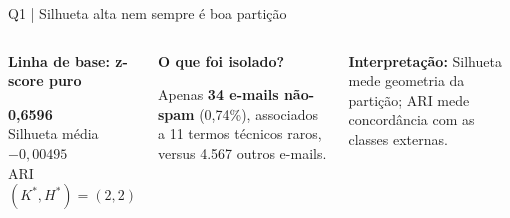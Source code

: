 \documentclass[aspectratio=169,11pt]{beamer}
\begin{document}
\begin{frame}[t]{Q1 | Silhueta alta nem sempre é boa partição}

\begin{columns}[T,onlytextwidth]
\begin{simplebox}\centering
\small \textbf{Linha de base: z-score puro}\par\vspace{2mm}
{\fontsize{23}{24}\selectfont\bfseries\color{laranja}0,6596}\\\scriptsize Silhueta média\\[2mm]
{\fontsize{23}{24}\selectfont\bfseries\color{cinazul}$-0,00495$}\\\scriptsize ARI\\[1mm]
\small $(K^*,H^*)=(2,2)$
\end{simplebox}
\begin{notabox}
\textbf{O que foi isolado?}\par\smallskip
\small Apenas \textbf{34 e-mails não-spam} (0,74\%), associados a 11 termos técnicos raros, versus 4.567 outros e-mails.
\end{notabox}
\vspace{2mm}
\begin{alertabox}\small \textbf{Interpretação:} Silhueta mede geometria da partição; ARI mede concordância com as classes externas.\end{alertabox}
\end{columns}

\end{frame}
\end{document}
